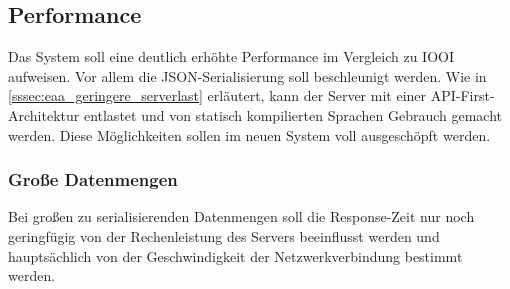\subsection{Performance}
\label{ssec:ea_performance}

Das System soll eine deutlich erhöhte Performance im Vergleich zu IOOI
aufweisen.  Vor allem die JSON-Serialisierung soll beschleunigt werden.  Wie in
\cref{sssec:eaa_geringere_serverlast} erläutert, kann der Server mit einer
API-First-Architektur entlastet und von statisch kompilierten Sprachen Gebrauch
gemacht werden.  Diese Möglichkeiten sollen im neuen System voll ausgeschöpft
werden.

\subsubsection{Große Datenmengen}
\label{sssec:eap_grosse_datenmengen}

Bei großen zu serialisierenden Datenmengen soll die Response-Zeit nur noch
geringfügig von der Rechenleistung des Servers beeinflusst werden und
hauptsächlich von der Geschwindigkeit der Netzwerkverbindung bestimmt werden.
